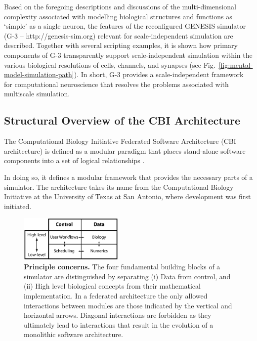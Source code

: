 \documentclass[11pt,3p,twocolumn]{JMN}
\begin{document}
Based on the foregoing descriptions and discussions of the multi-dimensional complexity associated with modelling biological structures and functions as ‘simple’ as a single neuron, the features of the reconfigured GENESIS simulator (G-3 -- http://genesis-sim.org) relevant for scale-independent simulation are described.  Together with several scripting examples, it is shown how primary components of G-3 transparently support scale-independent simulation within the various biological resolutions of cells, channels, and synapses (see Fig.~\ref{fig:mental-model-simulation-path}). In short, G-3 provides a scale-independent framework for computational neuroscience that resolves the problems associated with multiscale simulation.

\subsection{Structural Overview of the CBI Architecture}
\label{subsection:CBI-architecture}

The Computational Biology Initiative Federated Software Architecture (CBI architecture) is defined as a modular paradigm that places stand-alone software components into a set of logical relationships \cite{cornelis12}.

In doing so, it defines a modular framework that provides the
necessary parts of a simulator. The architecture takes its name from the Computational Biology Initiative at the University of Texas at San Antonio, where development was first initiated.

\begin{figure}[ht]
\begin{center}
\includegraphics[width=0.45\textwidth]{figures/pone.0028956.g002.png}
\end{center}
\caption{\small{\textbf{Principle concerns.} The four fundamental building blocks of a simulator are distinguished by separating (i) Data from control, and (ii) High level biological concepts from their mathematical implementation. In a federated architecture the only allowed interactions between modules are those indicated by the vertical and horizontal arrows. Diagonal interactions are forbidden as they ultimately lead to interactions that result in the evolution of a monolithic software architecture.}}
\label{fig:concerns}
\end{figure}
\end{document}
